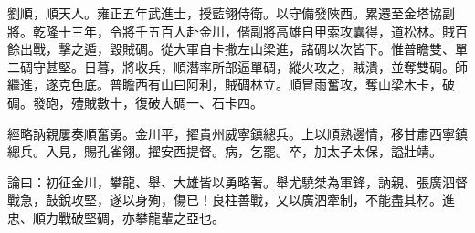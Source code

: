 \begin{pinyinscope}
劉順，順天人。雍正五年武進士，授藍翎侍衛。以守備發陜西。累遷至金塔協副將。乾隆十三年，令將千五百人赴金川，偕副將高雄自甲索攻囊得，道松林。賊百餘出戰，擊之遁，毀賊碉。從大軍自卡撒左山梁進，諸碉以次皆下。惟普瞻雙、單二碉守甚堅。日暮，將收兵，順潛率所部逼單碉，縱火攻之，賊潰，並奪雙碉。師繼進，遂克色底。普瞻西有山曰阿利，賊碉林立。順冒雨奮攻，奪山梁木卡，破碉。發砲，殪賊數十，復破大碉一、石卡四。

經略訥親屢奏順奮勇。金川平，擢貴州威寧鎮總兵。上以順熟邊情，移甘肅西寧鎮總兵。入見，賜孔雀翎。擢安西提督。病，乞罷。卒，加太子太保，謚壯靖。

論曰：初征金川，攀龍、舉、大雄皆以勇略著。舉尤驍桀為軍鋒，訥親、張廣泗督戰急，鼓銳攻堅，遂以身殉，傷已！良柱善戰，又以廣泗牽制，不能盡其材。進忠、順力戰破堅碉，亦攀龍輩之亞也。


\end{pinyinscope}